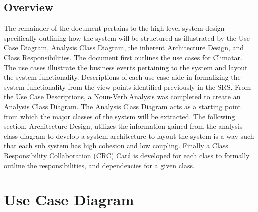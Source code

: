 \documentclass[]{article}
\begin{document}
\subsection{Overview}
\label{sub:overview}
The remainder of the document pertains to the high level system design specifically outlining how the system will be structured as illustrated by the Use Case Diagram, Analysis Class Diagram, the inherent Architecture Design, and Class Responsibilities. The document first outlines the use cases for Climatar. The use cases illustrate the business events pertaining to the system and layout the system functionality. Descriptions of each use case aide in formalizing the system functionality from the view points identified previously in the SRS. From the Use Case Descriptions, a Noun-Verb Analysis was completed to create an Analysis Class Diagram. The Analysis Class Diagram acts as a starting point from which the major classes of the system will be extracted. The following section, Architecture Design, utilizes the information gained from the analysis class diagram to develop a system architecture to layout the system is a way such that each sub system has high cohesion and low coupling. Finally a Class Responsibility Collaboration (CRC) Card is developed for each class to formally outline the responsibilities, and dependencies for a given class.

\vspace{20mm}


\section{Use Case Diagram}
\label{sec:use_case_diagram}
\end{document}
